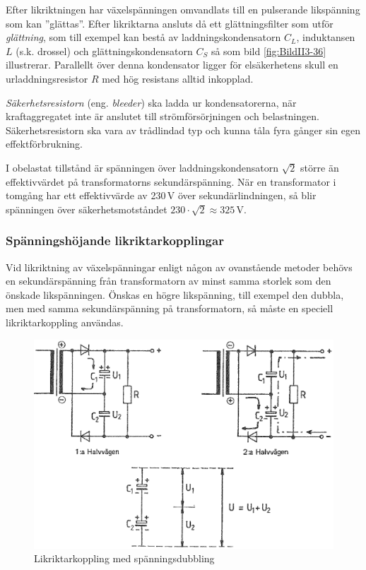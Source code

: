 Efter likriktningen har växelspänningen omvandlats till en pulserande
likspänning som kan ''glättas''.
Efter likriktarna ansluts då ett glättningsfilter som utför \emph{glättning},
som till exempel kan bestå av laddningskondensatorn \(C_L\), induktansen \(L\) (s.k.
drossel) och glättningskondensatorn \(C_S\) så som bild \ref{fig:BildII3-36}
illustrerar.
Parallellt över denna kondensator ligger för elsäkerhetens skull en
urladdningsresistor \(R\) med hög resistans alltid inkopplad.

\emph{Säkerhetsresistorn} (eng. \emph{bleeder}) ska ladda ur kondensatorerna,
när kraftaggregatet inte är anslutet till strömförsörjningen och belastningen.
Säkerhetsresistorn ska vara av trådlindad typ och kunna tåla fyra gånger sin
egen effektförbrukning.

I obelastat tillstånd är spänningen över laddningskondensatorn \(\sqrt{2}\)
större än effektivvärdet på transformatorns sekundärspänning.
När en transformator i tomgång har ett effektivvärde av 230\,V över
sekundärlindningen, så blir spänningen över säkerhetsmotståndet
\(230\cdot\sqrt{2} \approx 325\)\,V.

\subsubsection{Spänningshöjande likriktarkopplingar}

Vid likriktning av växelspänningar enligt någon av ovanstående metoder behövs
en sekundärspänning från transformatorn av minst samma storlek som den önskade
likspänningen.
Önskas en högre likspänning, till exempel den dubbla, men med samma sekundärspänning
på transformatorn, så måste en speciell likriktarkoppling användas.

\begin{figure}
\includegraphics[width=\textwidth]{images/cropped_pdfs/bild_2_3-37.pdf}
\caption{Likriktarkoppling med spänningsdubbling}
\label{fig:BildII3-37}
\end{figure}

